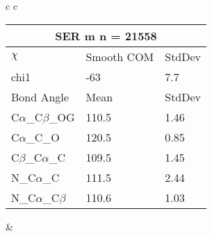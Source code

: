 \begin{longtable}{ c c }
\begin{tabular}{ l l l }
  \toprule
  \multicolumn{3}{c}{SER \textbf{m} n = 21558} \\ \toprule
  $\chi$       & Smooth COM & StdDev \\ \midrule
  chi1 & -63 & 7.7 \\ \midrule
  Bond Angle   & Mean     & StdDev \\ \midrule
  C$\alpha$\_C$\beta$\_OG & 110.5 & 1.46\\
  C$\alpha$\_C\_O & 120.5 & 0.85\\
  C$\beta$\_C$\alpha$\_C & 109.5 & 1.45\\
  N\_C$\alpha$\_C & 111.5 & 2.44\\
  N\_C$\alpha$\_C$\beta$ & 110.6 & 1.03\\
  \bottomrule
  \end{tabular}
  &
  \\
  
\end{longtable}

\newpage

